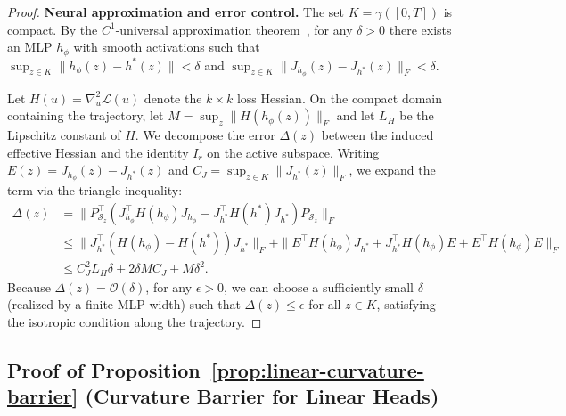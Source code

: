 \documentclass{article}
\theoremstyle{plain}
\theoremstyle{definition}
\theoremstyle{remark}
\begin{document}
\begin{proof}
\textbf{Neural approximation and error control.}
The set $K=\gamma([0,T])$ is compact. By the $C^1$-universal approximation theorem~\citep{hornik1991approximation, pinkus1999approximation}, for any $\delta>0$ there exists an MLP $h_\phi$ with smooth activations such that $\sup_{z\in K}\|h_\phi(z)-h^*(z)\|<\delta$ and $\sup_{z\in K}\|J_{h_\phi}(z)-J_{h^*}(z)\|_F<\delta$. 

Let $H(u) = \nabla_u^2 \mathcal{L}(u)$ denote the $k \times k$ loss Hessian. On the compact domain containing the trajectory, let $M = \sup_{z} \|H(h_\phi(z))\|_F$ and let $L_H$ be the Lipschitz constant of $H$. We decompose the error $\Delta(z)$ between the induced effective Hessian and the identity $I_r$ on the active subspace. Writing $E(z) = J_{h_\phi}(z) - J_{h^*}(z)$ and $C_J = \sup_{z \in K} \|J_{h^*}(z)\|_F$, we expand the term via the triangle inequality:
\begin{align*}
    \Delta(z) &= \| P_{\mathcal{S}_z}^\top (J_{h_\phi}^\top H(h_\phi) J_{h_\phi} - J_{h^*}^\top H(h^*) J_{h^*}) P_{\mathcal{S}_z} \|_F \\
    &\le \| J_{h^*}^\top (H(h_\phi) - H(h^*)) J_{h^*} \|_F + \| E^\top H(h_\phi) J_{h^*} + J_{h^*}^\top H(h_\phi) E + E^\top H(h_\phi) E \|_F \\
    &\le C_J^2 L_H \delta + 2 \delta M C_J + M \delta^2.
\end{align*}
Because $\Delta(z) = \mathcal{O}(\delta)$, for any $\epsilon > 0$, we can choose a sufficiently small $\delta$ (realized by a finite MLP width) such that $\Delta(z) \le \epsilon$ for all $z \in K$, satisfying the isotropic condition along the trajectory.
\end{proof}

\subsection{Proof of Proposition~\ref{prop:linear-curvature-barrier} (Curvature Barrier for Linear Heads)}
\end{document}
